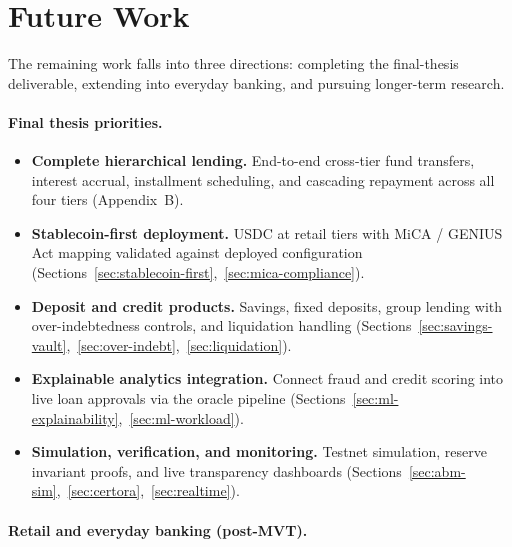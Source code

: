\documentclass[12pt, a4paper]{report}
\begin{document}
\section{Future Work}
\label{sec:future-work}

The remaining work falls into three directions: completing the final-thesis deliverable, extending into everyday banking, and pursuing longer-term research.

\paragraph{Final thesis priorities.}
\begin{itemize}[noitemsep]
\item \textbf{Complete hierarchical lending.} End-to-end cross-tier fund transfers, interest accrual, installment scheduling, and cascading repayment across all four tiers (Appendix~B).
\item \textbf{Stablecoin-first deployment.} USDC at retail tiers with MiCA / GENIUS Act mapping validated against deployed configuration (Sections~\ref{sec:stablecoin-first},~\ref{sec:mica-compliance}).
\item \textbf{Deposit and credit products.} Savings, fixed deposits, group lending with over-indebtedness controls, and liquidation handling (Sections~\ref{sec:savings-vault},~\ref{sec:over-indebt},~\ref{sec:liquidation}).
\item \textbf{Explainable analytics integration.} Connect fraud and credit scoring into live loan approvals via the oracle pipeline (Sections~\ref{sec:ml-explainability},~\ref{sec:ml-workload}).
\item \textbf{Simulation, verification, and monitoring.} Testnet simulation, reserve invariant proofs, and live transparency dashboards (Sections~\ref{sec:abm-sim},~\ref{sec:certora},~\ref{sec:realtime}).
\end{itemize}

\paragraph{Retail and everyday banking (post-MVT).}
\label{sec:future-retail-payments}
\end{document}
